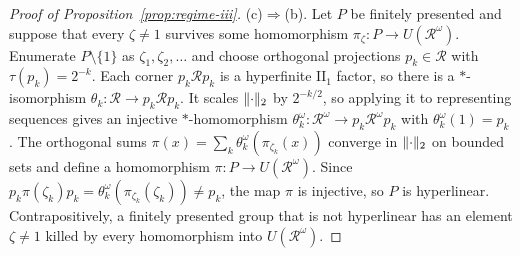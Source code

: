 \begin{proof}[Proof of Proposition~\ref{prop:regime-iii}]
(c)$\Rightarrow$(b). Let $P$ be finitely presented and suppose that every $\zeta\ne1$ survives some
homomorphism $\pi_\zeta:P\to U(\mathcal R^\omega)$. Enumerate $P\setminus\{1\}$ as
$\zeta_1,\zeta_2,\ldots$ and choose orthogonal projections $p_k\in\mathcal R$ with $\tau(p_k)=2^{-k}$.
Each corner $p_k\mathcal Rp_k$ is a hyperfinite $\mathrm{II}_1$ factor, so there is a $*$-isomorphism
$\theta_k:\mathcal R\to p_k\mathcal Rp_k$. It scales $\lVert \cdot\rVert_2$ by $2^{-k/2}$, so applying it to
representing sequences gives an injective $*$-homomorphism
$\theta_k^\omega:\mathcal R^\omega\to p_k\mathcal R^\omega p_k$ with $\theta_k^\omega(1)=p_k$. The
orthogonal sums $\pi(x)=\sum_k\theta_k^\omega(\pi_{\zeta_k}(x))$ converge in $\lVert \cdot\rVert_2$ on bounded sets
and define a homomorphism $\pi:P\to U(\mathcal R^\omega)$. Since
$p_k\pi(\zeta_k)p_k=\theta_k^\omega(\pi_{\zeta_k}(\zeta_k))\ne p_k$, the map $\pi$ is injective, so $P$
is hyperlinear. Contrapositively, a finitely presented group that is not hyperlinear has an element
$\zeta\ne1$ killed by every homomorphism into $U(\mathcal R^\omega)$.
\end{proof}
